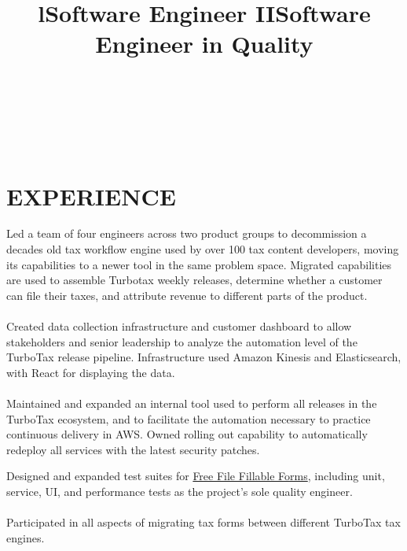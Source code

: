 \documentclass[margin]{res}
\begin{document}
\begin{resume}

\begin{format}
\title{l}\\
\\
\body\\
\end{format}

\section{EXPERIENCE}

\title{\textbf{Software Engineer II}}
\begin{position}
Led a team of four engineers across two product groups to decommission a decades old tax workflow engine used by over 100 tax content developers, moving its capabilities to a newer tool in the same problem space. Migrated capabilities are used to assemble Turbotax weekly releases, determine whether a customer can file their taxes, and attribute revenue to different parts of the product.
\\
\\
Created data collection infrastructure and customer dashboard to allow stakeholders and senior leadership to analyze the automation level of the TurboTax release pipeline. Infrastructure used Amazon Kinesis and Elasticsearch, with React for displaying the data.
\\
\\
Maintained and expanded an internal tool used to perform all releases in the TurboTax ecosystem, and to facilitate the automation necessary to practice continuous delivery in AWS. Owned rolling out capability to automatically redeploy all services with the latest security patches.
\end{position}

\title{\textbf{Software Engineer in Quality}}
\begin{position}
Designed and expanded test suites for \href{https://www.FreeFileFillableForms.com}{Free File Fillable Forms}, including unit, service, UI, and performance tests as the project's sole quality engineer.
\\
\\
Participated in all aspects of migrating tax forms between different TurboTax tax engines.
\end{position}


\end{resume}
\end{document}
